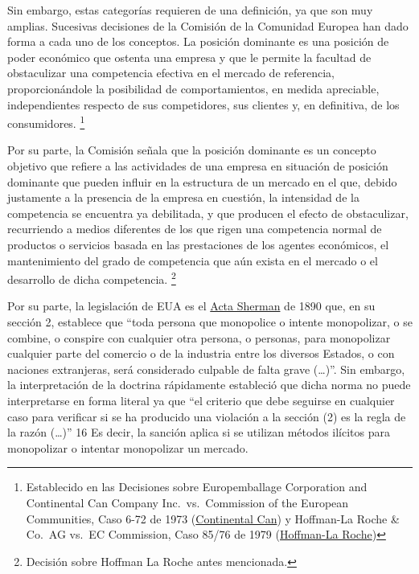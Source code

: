\documentclass[
  12pt,
  spanish,
]{book}
\begin{document}
Sin embargo, estas categorías requieren de una definición, ya que son
muy amplias. Sucesivas decisiones de la Comisión de la Comunidad Europea
han dado forma a cada uno de los conceptos. La posición dominante es una
posición de poder económico que ostenta una empresa y que le permite la
facultad de obstaculizar una competencia efectiva en el mercado de
referencia, proporcionándole la posibilidad de comportamientos, en
medida apreciable, independientes respecto de sus competidores, sus
clientes y, en definitiva, de los consumidores. \footnote{Establecido en
  las Decisiones sobre Europemballage Corporation and Continental Can
  Company Inc.~vs.~Commission of the European Communities, Caso 6-72 de
  1973
  (\href{https://eur-lex.europa.eu/legal-content/ES/TXT/PDF/?uri=CELEX:61972CJ0006\&from=EN}{Continental
  Can}) y Hoffman-La Roche \& Co.~AG vs.~EC Commission, Caso 85/76 de
  1979
  (\href{https://eur-lex.europa.eu/LexUriServ/LexUriServ.do?uri=CELEX:61976CJ0085:EN:PDF}{Hoffman-La
  Roche})}

Por su parte, la Comisión señala que la posición dominante es un
concepto objetivo que refiere a las actividades de una empresa en
situación de posición dominante que pueden influir en la estructura de
un mercado en el que, debido justamente a la presencia de la empresa en
cuestión, la intensidad de la competencia se encuentra ya debilitada, y
que producen el efecto de obstaculizar, recurriendo a medios diferentes
de los que rigen una competencia normal de productos o servicios basada
en las prestaciones de los agentes económicos, el mantenimiento del
grado de competencia que aún exista en el mercado o el desarrollo de
dicha competencia. \footnote{Decisión sobre Hoffman La Roche antes
  mencionada.}

Por su parte, la legislación de EUA es el
\href{https://www.law.cornell.edu/uscode/text/15/1}{Acta Sherman} de
1890 que, en su sección 2, establece que ``toda persona que monopolice o
intente monopolizar, o se combine, o conspire con cualquier otra
persona, o personas, para monopolizar cualquier parte del comercio o de
la industria entre los diversos Estados, o con naciones extranjeras,
será considerado culpable de falta grave (\ldots)''. Sin embargo, la
interpretación de la doctrina rápidamente estableció que dicha norma no
puede interpretarse en forma literal ya que ``el criterio que debe
seguirse en cualquier caso para verificar si se ha producido una
violación a la sección (2) es la regla de la razón (\ldots)'' 16 Es
decir, la sanción aplica si se utilizan métodos ilícitos para
monopolizar o intentar monopolizar un mercado.
\end{document}
